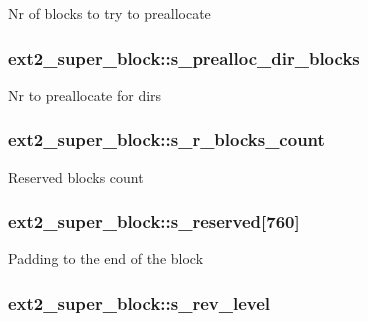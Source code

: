Nr of blocks to try to preallocate \hypertarget{structext2__super__block_aa820a721fcbf64ee9aa797bca3171785}{
\subsubsection[{s\+\_\+prealloc\+\_\+dir\+\_\+blocks}]{ ext2\+\_\+super\+\_\+block\+::s\+\_\+prealloc\+\_\+dir\+\_\+blocks}}\label{structext2__super__block_aa820a721fcbf64ee9aa797bca3171785}
Nr to preallocate for dirs \hypertarget{structext2__super__block_a660db33fc94622167793c6b080c515e4}{
\subsubsection[{s\+\_\+r\+\_\+blocks\+\_\+count}]{ ext2\+\_\+super\+\_\+block\+::s\+\_\+r\+\_\+blocks\+\_\+count}}\label{structext2__super__block_a660db33fc94622167793c6b080c515e4}
Reserved blocks count \hypertarget{structext2__super__block_a17e0d263a7fceb8b53aff24b66c216df}{
\subsubsection[{s\+\_\+reserved}]{ ext2\+\_\+super\+\_\+block\+::s\+\_\+reserved\mbox{[}760\mbox{]}}}\label{structext2__super__block_a17e0d263a7fceb8b53aff24b66c216df}
Padding to the end of the block \hypertarget{structext2__super__block_a70b07eaf44b6a5e777b8072ee4b593b4}{
\subsubsection[{s\+\_\+rev\+\_\+level}]{ ext2\+\_\+super\+\_\+block\+::s\+\_\+rev\+\_\+level}}\label{structext2__super__block_a70b07eaf44b6a5e777b8072ee4b593b4}
